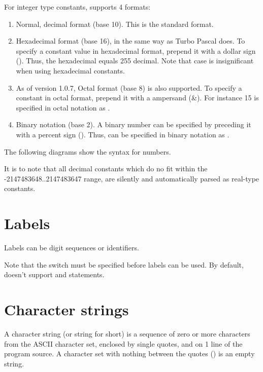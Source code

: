 For integer type constants, \fpc supports 4 formats:
\begin{enumerate}
\item Normal, decimal format (base 10). This is the standard format.
\item Hexadecimal format (base 16), in the same way as Turbo Pascal does.
To specify a constant value in hexadecimal format, prepend it with a dollar
sign (\var{\$}). Thus, the hexadecimal  equals 255 decimal.
Note that case is insignificant when using hexadecimal constants.
\item As of version 1.0.7, Octal format (base 8) is also supported.
To specify a constant in octal format, prepend it with a ampersand (\&).
For instance 15 is specified in octal notation as .
\item Binary notation (base 2). A binary number can be specified
by preceding it with a percent sign (\var{\%}). Thus,  can be
specified in binary notation as .
\end{enumerate}
The following diagrams show the syntax for numbers.


\begin{remark}
It is to note that all decimal constants which do no fit within
the -2147483648..2147483647 range, are silently and automatically
parsed as real-type constants.
\end{remark}

\section{Labels}
Labels can be digit sequences or identifiers.

\begin{remark}
Note that the  switch must be specified before labels can be used.
By default, \fpc doesn't support  and  statements.
\end{remark}

\section{Character strings}
A character string (or string for short) is a sequence of zero or more
characters from the ASCII character set, enclosed by single quotes, and on 1
line of the program source.
A character set with nothing between the quotes () is an empty
string.

